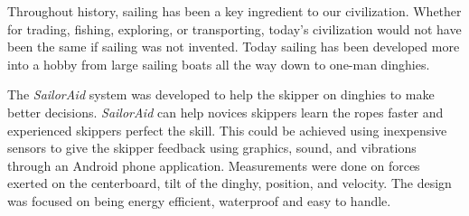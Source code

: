 Throughout history, sailing has been a key ingredient to our civilization. Whether for trading, fishing, exploring, or transporting, today's civilization would not have been the same if sailing was not invented. Today sailing has been developed more into a hobby from large sailing boats all the way down to one-man dinghies. 

The \emph{SailorAid} system was developed to help the \gls{skipper} on dinghies to make better decisions. \emph{SailorAid} can help novices \gls{skipper}s learn the ropes faster and experienced skippers perfect the skill.  This could be achieved using inexpensive sensors to give the \gls{skipper} feedback using graphics, sound, and vibrations through an Android phone application. Measurements were done on forces exerted on the centerboard, tilt of the dinghy, position, and velocity. The design was focused on being energy efficient, waterproof and easy to handle.
